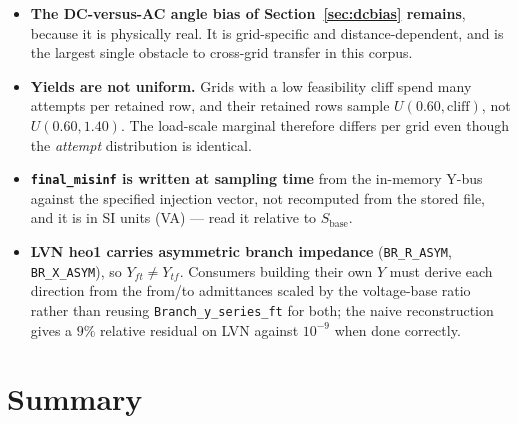 \documentclass{article}
\begin{document}
\begin{itemize}[leftmargin=*]
\item \textbf{The DC-versus-AC angle bias of Section~\ref{sec:dcbias} remains},
  because it is physically real.  It is grid-specific and distance-dependent,
  and is the largest single obstacle to cross-grid transfer in this corpus.
\item \textbf{Yields are not uniform.}  Grids with a low feasibility cliff spend
  many attempts per retained row, and their retained rows sample
  $U(0.60,\text{cliff})$, not $U(0.60,1.40)$.  The load-scale marginal therefore
  differs per grid even though the \emph{attempt} distribution is identical.
\item \textbf{\texttt{final\_misinf} is written at sampling time} from the
  in-memory Y-bus against the specified injection vector, not recomputed from
  the stored file, and it is in SI units (VA) --- read it relative to
  $S_{\text{base}}$.
\item \textbf{LVN heo1 carries asymmetric branch impedance}
  (\texttt{BR\_R\_ASYM}, \texttt{BR\_X\_ASYM}), so $Y_{ft} \neq Y_{tf}$.
  Consumers building their own $Y$ must derive each direction from the from/to
  admittances scaled by the voltage-base ratio rather than reusing
  \texttt{Branch\_y\_series\_ft} for both; the naive reconstruction gives a
  $9\%$ relative residual on LVN against $10^{-9}$ when done correctly.
\end{itemize}


\section{Summary}
\end{document}
